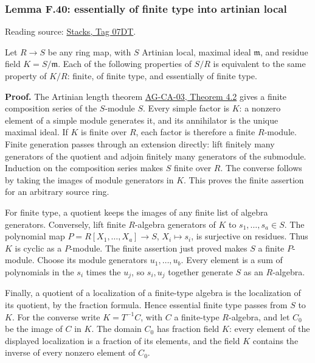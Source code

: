 \documentclass[11pt,a4paper,openany]{report}
\begin{document}
\label{AG-RG-S05-algebra-lemma-essentially-of-finite-type-into-artinian-local}

\subsubsection{Lemma F.40: essentially of finite type into artinian local}\label{AG-RG-S05-lemma-f.40-essentially-of-finite-type-into-artinian-local}

Reading source: \href{https://stacks.math.columbia.edu/tag/07DT}{Stacks, Tag 07DT}.

Let \(R\to S\) be any ring map, with \(S\) Artinian local, maximal ideal \(\mathfrak m\), and residue field \(K=S/\mathfrak m\). Each of the following properties of \(S/R\) is equivalent to the same property of \(K/R\): finite, of finite type, and essentially of finite type.

\textbf{Proof.} The Artinian length theorem \href{https://github.com/KokunoYumeto/open-math-courses/blob/d02d0a3669f42579db037cd44de1d113fdd770a1/docs/courses/AG-CA/src/noetherian-and-artinian-rings.md}{AG-CA-03, Theorem 4.2} gives a finite composition series of the \(S\)-module \(S\). Every simple factor is \(K\): a nonzero element of a simple module generates it, and its annihilator is the unique maximal ideal. If \(K\) is finite over \(R\), each factor is therefore a finite \(R\)-module. Finite generation passes through an extension directly: lift finitely many generators of the quotient and adjoin finitely many generators of the submodule. Induction on the composition series makes \(S\) finite over \(R\). The converse follows by taking the images of module generators in \(K\). This proves the finite assertion for an arbitrary source ring.

For finite type, a quotient keeps the images of any finite list of algebra generators. Conversely, lift finite \(R\)-algebra generators of \(K\) to \(s_1,\ldots,s_a\in S\). The polynomial map \(P=R[X_1,\ldots,X_a]\to S\), \(X_i\mapsto s_i\), is surjective on residues. Thus \(K\) is cyclic as a \(P\)-module. The finite assertion just proved makes \(S\) a finite \(P\)-module. Choose its module generators \(u_1,\ldots,u_b\). Every element is a sum of polynomials in the \(s_i\) times the \(u_j\), so \(s_i,u_j\) together generate \(S\) as an \(R\)-algebra.

Finally, a quotient of a localization of a finite-type algebra is the localization of its quotient, by the fraction formula. Hence essential finite type passes from \(S\) to \(K\). For the converse write \(K=T^{-1}C\), with \(C\) a finite-type \(R\)-algebra, and let \(C_0\) be the image of \(C\) in \(K\). The domain \(C_0\) has fraction field \(K\): every element of the displayed localization is a fraction of its elements, and the field \(K\) contains the inverse of every nonzero element of \(C_0\).
\end{document}
